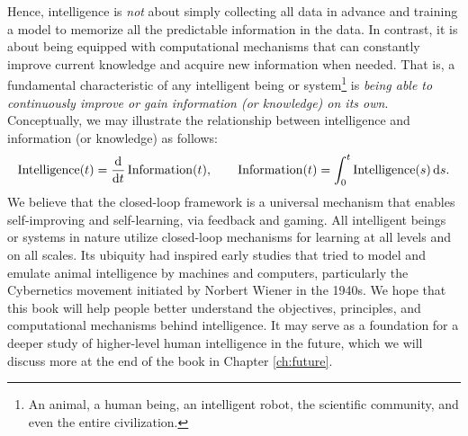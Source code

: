 \documentclass[../../book-main.tex]{subfiles}
\begin{document}
Hence, intelligence is {\em not} about simply collecting all data in advance and training a model to memorize all the predictable information in the data. In contrast, it is about being equipped with computational mechanisms that can constantly improve current knowledge and acquire new information when needed. That is, a fundamental characteristic of any intelligent being or system\footnote{An animal, a human being, an intelligent robot, the scientific community, and even the entire civilization.} is {\em being able to continuously improve or gain information (or knowledge) on its own}. Conceptually, we may illustrate the relationship between intelligence and information (or knowledge) as follows:
\begin{equation}
\operatorname{Intelligence}(t) = \odv*{\operatorname{Information}}{t}(t), \qquad 
\operatorname{Information}(t)  = \int_0^t \operatorname{Intelligence}(s) \odif{s}.
\end{equation}
We believe that the closed-loop framework is a universal mechanism that enables self-improving and self-learning, via feedback and gaming. All intelligent beings or systems in nature utilize closed-loop mechanisms for learning at all levels and on all scales. Its ubiquity had inspired early studies that tried to model and emulate animal intelligence by machines and computers, particularly the Cybernetics movement initiated by Norbert Wiener in the 1940s. We hope that this book will help people better understand the objectives, principles, and computational mechanisms behind intelligence. It may serve as a foundation for a deeper study of higher-level human intelligence in the future, which we will discuss more at the end of the book in Chapter \ref{ch:future}.
\end{document}
